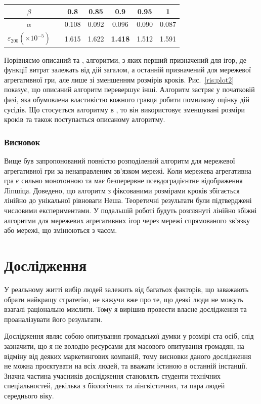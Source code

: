 \documentclass[a4paper]{article}
\begin{document}
\begin{table}
\begin{tabular}{ | c | c | c | c | c | c | c | }
\hline
$\beta$&& 0.8&0.85 &0.9 &0.95 &1 \\\hline
$\alpha$&&0.108 &0.092 &0.096 &0.090& 0.087\\\hline
$\varepsilon _{200} (\times 10^{-5})$&& 1.615&1.622 & \textbf{1.418}&1.512 &1.591\\
\hline
\end{tabular}
\end{table}
Порівняємо описаний та \cite{Cite2}, \cite{Cite3} алгоритми, з яких перший призначений для ігор, де функції витрат залежать від дій загалом, а останній призначений для мережевої агрегативної гри, але лише зі зменшенням розмірів кроків. Рис.~\ref{ris:plot2} показує, що описаний алгоритм перевершує інші. Алгоритм \cite{Cite2} застряє у початковій фазі, яка обумовлена властивістю кожного гравця робити помилкову оцінку дій сусідів. Що стосується алгоритму в \cite{Cite3}, то він використовує зменшувані розміри кроків та також поступається описаному алгоритму.

\subsubsection*{Висновок}
Вище був запропонований повністю розподілений алгоритм для мережевої агрегативної гри за ненаправленим зв’язком мережі. Коли мережева агрегативна гра є сильно монотонною та має безперервне псевдоградієнтне відображення Ліпшіца. Доведено, що алгоритм з фіксованими розмірами кроків збігається лінійно до унікальної рівноваги Неша. Теоретичні результати були підтверджені числовими експериментами. У подальшій роботі будуть розглянуті лінійно збіжні алгоритми для мережевих агрегативних ігор через мережі спрямованого зв'язку або мережі, що змінюються з часом.
\clearpage
\section{Дослідження}
У реальному житті вибір людей залежить від багатьох факторів, що заважають обрати найкращу стратегію, не кажучи вже про те, що деякі люди не можуть взагалі раціонально мислити. Тому я вирішив провести власне дослідження та проаналізувати його результати.

Дослідження являє собою опитування громадської думки у розмірі ста осіб, слід зазначити, що я не володію ресурсами для масового опитування громадян, на відміну від деяких маркетингових компаній, тому висновки даного дослідження не можна проєктувати на всіх людей, та вважати істиною в останній інстанції. Значна частина учасників дослідження становлять студенти технічних спеціальностей, декілька з біологічних та лінгвістичних, та пара людей середнього віку.
\end{document}

